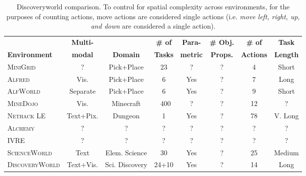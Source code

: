 \begin{table}[t]
\centering
\scriptsize
\caption{\footnotesize Discoveryworld comparison. To control for spatial complexity across environments, for the purposes of counting actions, move actions are considered single actions (i.e. \textit{move left, right, up, and down} are considered a single action). }
\label{tab:env_comparison}
\begin{tabular}{lccccccc}
\toprule
\textbf{}               &   \textbf{Multi-}    &   \textbf{} &   \textbf{\# of}  &            \textbf{Para-}           &   \textbf{\# Obj.}  & \textbf{\# of}   & \textbf{Task}  \\
\textbf{Environment}    &   \textbf{modal}    &   \textbf{Domain} &   \textbf{Tasks}  &   \textbf{metric} &   \textbf{Props.}  & \textbf{Actions}   & \textbf{Length}  \\
\midrule

\textsc{MiniGrid}~\citep{MinigridMiniworld23}       &   ?           & Pick+Place            &  23    & ?     & ?     & 4     &   Short       \\
\textsc{Alfred}~\citep{ALFRED20}         &   Vis.        & Pick+Place            &  6    & Yes   & ?     & 7     &   Long       \\
\textsc{AlfWorld}~\citep{Shridhar2020ALFWorldAT}       &   Separate    & Pick+Place            &  6    & Yes   & ?     & 9     &   Short       \\
\textsc{MineDojo}~\citep{fan2022minedojo}       &   Vis.        & Minecraft             &  ~400 & ?     & ?     & 12    &   ?     \\
\textsc{Nethack LE}~\citep{NetHack}     &   Text+Pix.   & Dungeon               &  1    & Yes   & ?     & 78    &   V. Long     \\
\textsc{Alchemy}~\citep{wang2021alchemy}        &   ?           & ?            &  ?    & ?     & ?     & ?     &   ?       \\
\textsc{IVRE}~\citep{xu2023interactive}           &   ?           & ?            &  ?    & ?     & ?     & ?     &   ?       \\
\textsc{ScienceWorld}~\citep{wang2022scienceworld}   &   Text        & Elem. Science         &  30   & Yes   & ?     & 25    &   Medium      \\
\textsc{DiscoveryWorld} &   Text+Vis.   & Sci. Discovery        &  24+10   & Yes   & ?     & 14    &   Long        \\
\bottomrule        
\end{tabular}
\end{table}



